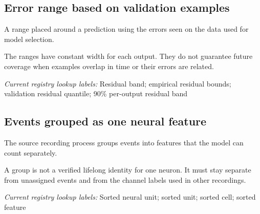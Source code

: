 \begin{samepage}
\subsection*{Error range based on validation examples}
\noindent A range placed around a prediction using the errors seen on the data used for model selection.\par
\end{samepage}
\begin{samepage}
\noindent The ranges have constant width for each output. They do not guarantee future coverage when examples overlap in time or their errors are related.\par\nopagebreak[4]

\end{samepage}


\noindent\textit{Current registry lookup labels:} Residual band; empirical residual bounds; validation residual quantile; 90\% per-output residual band\par

\begin{samepage}
\subsection*{Events grouped as one neural feature}
\noindent The source recording process groups events into features that the model can count separately.\par
\end{samepage}
\begin{samepage}
\noindent A group is not a verified lifelong identity for one neuron. It must stay separate from unassigned events and from the channel labels used in other recordings.\par\nopagebreak[4]

\end{samepage}


\noindent\textit{Current registry lookup labels:} Sorted neural unit; sorted unit; sorted cell; sorted feature\par

